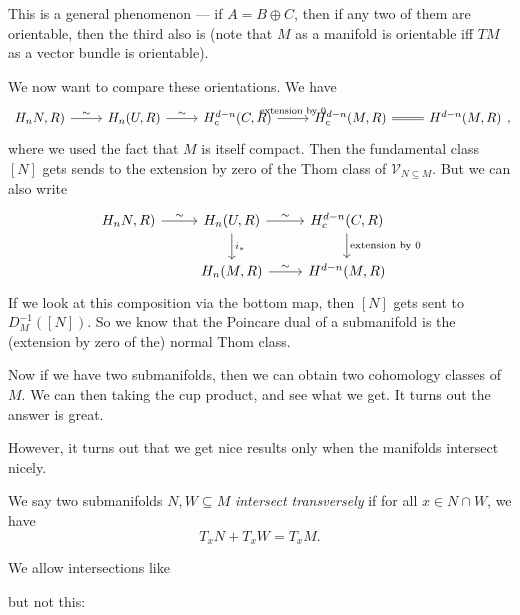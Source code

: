 \documentclass[a4paper]{article}
\begin{document}
This is a general phenomenon --- if $A = B \oplus C$, then if any two of them are orientable, then the third also is (note that $M$ as a manifold is orientable iff $TM$ as a vector bundle is orientable).

We now want to compare these orientations. We have
\[
  \begin{tikzcd}
    H_nN, R) \ar[r, "\sim"] & H_n(U, R) \ar[r, "\sim"] & H_c^{d - n}(C, R) \ar[r, "\text{extension by }0"] & H_c^{d - n}(M, R) \ar[r, equals] & H^{d - n}(M, R)
  \end{tikzcd},
\]
where we used the fact that $M$ is itself compact. Then the fundamental class $[N]$ gets sends to the extension by zero of the Thom class of $\mathcal{V}_{N \subseteq M}$.
But we can also write
\[
  \begin{tikzcd}
    H_nN, R) \ar[r, "\sim"] & H_n(U, R) \ar[r, "\sim"] \ar[d, "i_*"] & H_c^{d - n}(C, R) \ar[d, "\text{extension by }0"] \\
    & H_n(M, R) \ar[r, "\sim"] & H^{d - n}(M, R)
  \end{tikzcd}
\]
If we look at this composition via the bottom map, then $[N]$ gets sent to $D_M^{-1}([N])$. So we know that the Poincare dual of a submanifold is the (extension by zero of the) normal Thom class.

Now if we have two submanifolds, then we can obtain two cohomology classes of $M$. We can then taking the cup product, and see what we get. It turns out the answer is great.

However, it turns out that we get nice results only when the manifolds intersect nicely.
\begin{defi}
  We say two submanifolds $N, W \subseteq M$ \emph{intersect transversely} if for all $x \in N \cap W$, we have
  \[
    T_x N + T_x W = T_x M.
  \]
\end{defi}

\begin{eg}
  We allow intersections like
  \begin{center}
  \end{center}
  but not this:
  \begin{center}
  \end{center}

\end{eg}
\end{document}
